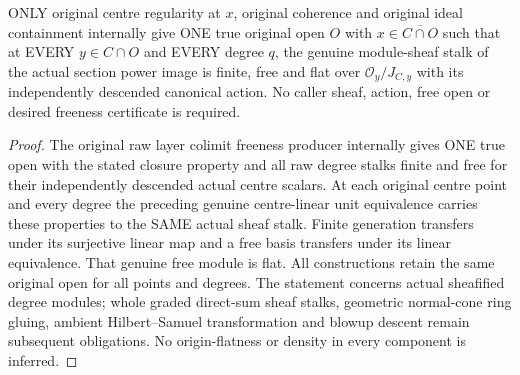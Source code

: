 \begin{theorem}
\label{hir:real-domain-original-all-actual-normal-layer-sheaf-degrees-free-open}
\leanok
ONLY original centre regularity at $x$, original coherence and original
ideal containment internally give ONE true original open $O$ with
$x\in\overline{C\cap O}$ such that at EVERY $y\in C\cap O$ and EVERY
degree $q$, the genuine module-sheaf stalk of the actual section power
image is finite, free and flat over $\mathcal O_y/J_{C,y}$ with its
independently descended canonical action. No caller sheaf, action,
free open or desired freeness certificate is required.
\end{theorem}
\begin{proof}
The original raw layer colimit freeness producer internally gives ONE
true open with the stated closure property and all raw degree stalks
finite and free for their independently descended actual centre scalars.
At each original centre point and every degree the preceding genuine
centre-linear unit equivalence carries these properties to the SAME
actual sheaf stalk. Finite generation transfers under its surjective
linear map and a free basis transfers under its linear equivalence.
That genuine free module is flat. All constructions retain the same
original open for all points and degrees. The statement concerns actual
sheafified degree modules; whole graded direct-sum sheaf stalks,
geometric normal-cone ring gluing, ambient Hilbert--Samuel transformation
and blowup descent remain subsequent obligations. No origin-flatness or
density in every component is inferred.
\end{proof}
